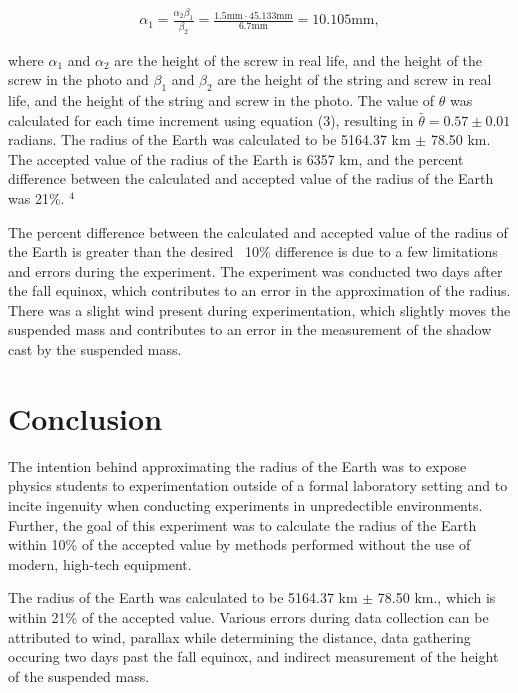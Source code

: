 \documentclass[twoside,10pt]{article}
\begin{document}
\begin{multicols}{2}
		\begin{gather*} 	
			\alpha_1 = \frac{\alpha_2 \beta_1}{\beta_2} = \frac{1.5 \text{mm} \cdot 45.133 \text{mm}}{6.7 \text{mm}} = 10.105 \text{mm},
		\end{gather*}
		
		where $\alpha_1$ and $\alpha_2$ are the height of the screw in real life, and the height of the screw in the photo and $\beta_1$ and $\beta_2$ are the height of the string and screw in real life, and the height of the string and screw in the photo. The value of $\theta$ was calculated for each time increment using equation (3), resulting in $\bar{\theta} = 0.57 \pm 0.01$ radians.  The radius of the Earth was calculated to be 5164.37 km $\pm$ 78.50 km. The accepted value of the radius of the Earth is 6357 km, and the percent difference between the calculated and accepted value of the radius of the Earth was 21\%. $^4$
		
		\indent The percent difference between the calculated and accepted value of the radius of the Earth is greater than the desired ~10\% difference is due to a few limitations and errors during the experiment. The experiment was conducted two days after the fall equinox, which contributes to an error in the approximation of the radius. There was a slight wind present during experimentation, which slightly moves the suspended mass and contributes to an error in the measurement of the shadow cast by the suspended mass. 
		\section{Conclusion}
		
		The intention behind approximating the radius of the Earth was to expose physics students to experimentation outside of a formal laboratory setting and to incite ingenuity when conducting experiments in unpredectible environments. Further, the goal of this experiment was to calculate the radius of the Earth within 10\% of the accepted value by methods performed without the use of modern, high-tech equipment. 
		
		\indent The radius of the Earth was calculated to be 5164.37 km $\pm$ 78.50 km., which is within 21\% of the accepted value. Various errors during data collection can be attributed to wind, parallax while determining the distance, data gathering occuring two days past the fall equinox, and indirect measurement of the height of the suspended mass. 
		

\end{multicols}
\end{document}
